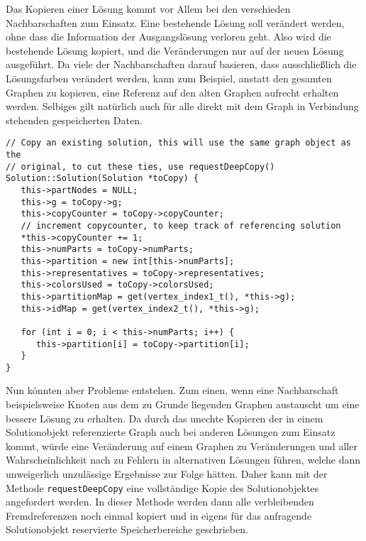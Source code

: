 Das Kopieren einer Lösung kommt vor Allem bei den verschieden Nachbarschaften zum Einsatz. Eine bestehende Lösung soll verändert werden, ohne dass die Information der Ausgangslösung verloren geht. Also wird
die bestehende Lösung kopiert, und die Veränderungen nur auf der neuen Lösung ausgeführt. Da viele der Nachbarschaften darauf basieren, dass ausschließlich die Lösungsfarben verändert werden, kann zum Beispiel, 
anstatt den gesamten Graphen zu kopieren, eine Referenz auf den alten Graphen aufrecht erhalten werden. Selbiges gilt natürlich auch für alle direkt mit dem Graph in Verbindung stehenden gespeicherten Daten.

\singlespacing
\begin{lstlisting}[caption={Der Kopierkonstruktor der Solutionklasse},label={lst:copy}]
// Copy an existing solution, this will use the same graph object as the 
// original, to cut these ties, use requestDeepCopy()
Solution::Solution(Solution *toCopy) {
   this->partNodes = NULL;
   this->g = toCopy->g;
   this->copyCounter = toCopy->copyCounter;
   // increment copycounter, to keep track of referencing solution
   *this->copyCounter += 1;
   this->numParts = toCopy->numParts;
   this->partition = new int[this->numParts];
   this->representatives = toCopy->representatives;
   this->colorsUsed = toCopy->colorsUsed;
   this->partitionMap = get(vertex_index1_t(), *this->g);
   this->idMap = get(vertex_index2_t(), *this->g);
   
   for (int i = 0; i < this->numParts; i++) {
      this->partition[i] = toCopy->partition[i];
   }
}
\end{lstlisting}

Nun könnten aber Probleme entstehen. Zum einen, wenn eine Nachbarschaft beispielsweise Knoten aus dem zu Grunde liegenden Graphen austauscht um eine bessere Lösung zu erhalten. Da durch das unechte Kopieren
der in einem Solutionobjekt referenzierte Graph auch bei anderen Lösungen zum Einsatz kommt, würde eine Veränderung auf einem Graphen zu Veränderungen und aller Wahrscheinlichkeit nach zu Fehlern in alternativen
Lösungen führen, welche dann unweigerlich unzulässige Ergebnisse zur Folge hätten. Daher kann mit der Methode \texttt{requestDeepCopy} eine vollständige Kopie des Solutionobjektes angefordert werden. In dieser
Methode werden dann alle verbleibenden Fremdreferenzen noch einmal kopiert und in eigens für das anfragende Solutionobjekt reservierte Speicherbereiche geschrieben.

